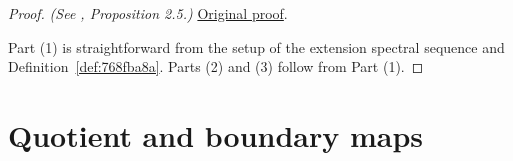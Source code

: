 \begin{proposition}

\sketch
\end{proposition}
\begin{proof}
\textit{(See \cite{LWX126}, Proposition 2.5.)} \href{paper/main.tex.html#L323}{Original proof}.

Part (1) is straightforward from the setup of the extension spectral sequence and Definition~\ref{def:768fba8a}. Parts (2) and (3) follow from Part (1).
\end{proof}


\section{Quotient and boundary maps}

